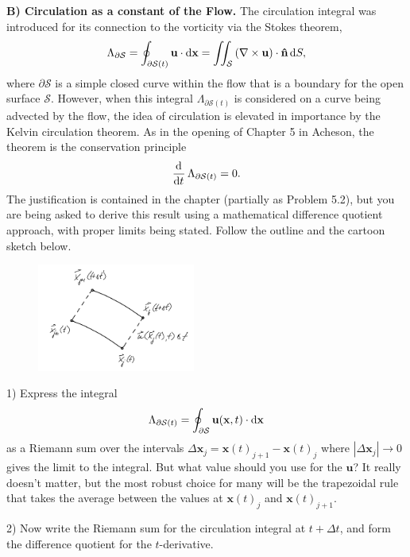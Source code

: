 \documentclass{article}
\def\*#1{\mathbf{#1}}
\newcommand{\fS}{\mathcal{S}} %
\newcommand{\nhat}{\mathbf{\hat{n}}}
\begin{document}
\textbf{B) Circulation as a constant of the Flow.}
The circulation integral was introduced for its connection to the
vorticity via the Stokes theorem,
%
\begin{equation*}
    \Lambda_{\partial \fS}
        = \oint_{\partial \fS (t)} \*u \cdot \dif \*x
        = \iint_{\fS} \del{\nabla \times \*u} \cdot \nhat \dif S
        ,
\end{equation*}
%
where $\partial \fS$ is a simple closed curve within the flow that is a
boundary for the open surface $\fS$. However, when this integral
$\Lambda_{\partial \fS (t)}$ is considered on a curve being advected by
the flow, the idea of circulation is elevated in importance by the
Kelvin circulation theorem. As in the opening of Chapter 5 in Acheson,
the theorem is the conservation principle
%
\begin{equation*}
    \dod{}{t} \Lambda_{\partial \fS (t)} = 0
    .
\end{equation*}
%
The justification is contained in the chapter (partially as Problem
5.2), but you are being asked to derive this result using a mathematical
difference quotient approach, with proper limits being stated. Follow
the outline and the cartoon sketch below.
%
\begin{figure}[!ht]
    \includegraphics[width=14em]{b-diag}
    \centering
\end{figure}

1) Express the integral
%
\begin{equation*}
    \Lambda_{\partial \fS (t)} = \oint_{\partial \fS} \*u(\*x, t) \cdot \dif \*x
\end{equation*}
%
as a Riemann sum over the intervals $\Delta \*x_j = \*x(t)_{j + 1} -
\*x(t)_j$ where $|\Delta \*x_j| \to 0$ gives the limit to the integral.
But what value should you use for the $\*u$? It really doesn't matter,
but the most robust choice for many will be the trapezoidal rule that
takes the average between the values at $\*x(t)_j$ and $\*x(t)_{j + 1}$.

2) Now write the Riemann sum for the circulation integral at $t + \Delta
t$, and form the difference quotient for the $t$-derivative.
\end{document}
